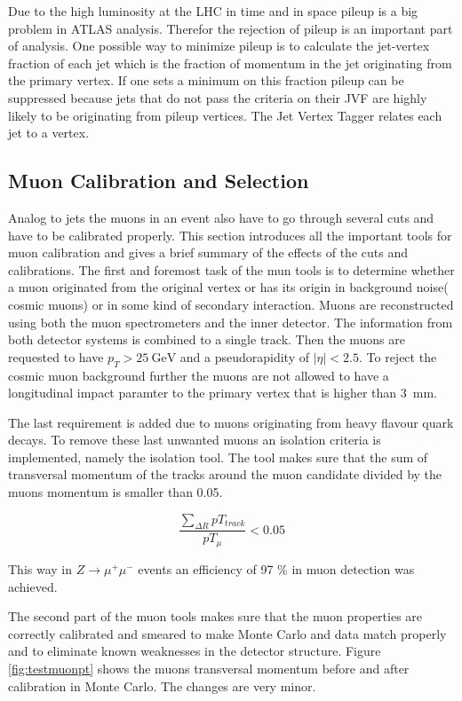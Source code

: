 Due to the high luminosity at the LHC in time and in space pileup is a big problem in ATLAS analysis. Therefor the rejection of pileup is an important part of analysis. One possible way to minimize pileup is to calculate the jet-vertex fraction of each jet which is the fraction of momentum in the jet originating from the primary vertex. If one sets a minimum on this fraction pileup can be suppressed because jets that do not pass the criteria on their JVF are highly likely to be originating from pileup vertices. The Jet Vertex Tagger relates each jet to a vertex.


\subsection{Muon Calibration and Selection}

Analog to jets the muons in an event also have to go through several cuts and have to be calibrated properly. This section introduces all the important tools for muon calibration and gives a brief summary of the effects of the cuts and calibrations.
The first and foremost task of the mun tools is to determine whether a muon originated from the original vertex or has its origin in background noise( cosmic muons) or in some kind of secondary interaction. Muons are reconstructed using both the muon spectrometers and the inner detector. The information from both detector systems is combined to a single track. Then the muons are requested to have $p_T > \SI{25}{\GeV}$ and a pseudorapidity of $|\eta| < \num{2.5}$. To reject the cosmic muon background further the muons are not allowed to have a longitudinal impact paramter to the primary vertex that is higher than \SI{3}{\mm}. 

The last requirement is added due to muons originating from heavy flavour quark decays.
To remove these last unwanted muons an isolation criteria is implemented, namely the isolation tool. The tool makes sure that the sum of transversal momentum of the tracks around the muon candidate divided by the muons momentum is smaller than \num{0.05}. 

\begin{equation}
\frac{\sum_{\Delta R}pT_{track}}{pT_{\mu}} < 0.05
\end{equation}

This way in $Z \rightarrow \mu^+ \mu^-$ events an efficiency of \num{97} \% in muon detection was achieved.

The second part of the muon tools makes sure that the muon properties are correctly calibrated and smeared to make Monte Carlo and data match properly and to eliminate known weaknesses in the detector structure. Figure \ref{fig:testmuonpt} shows the muons transversal momentum before and after calibration in Monte Carlo. The changes are very minor.

